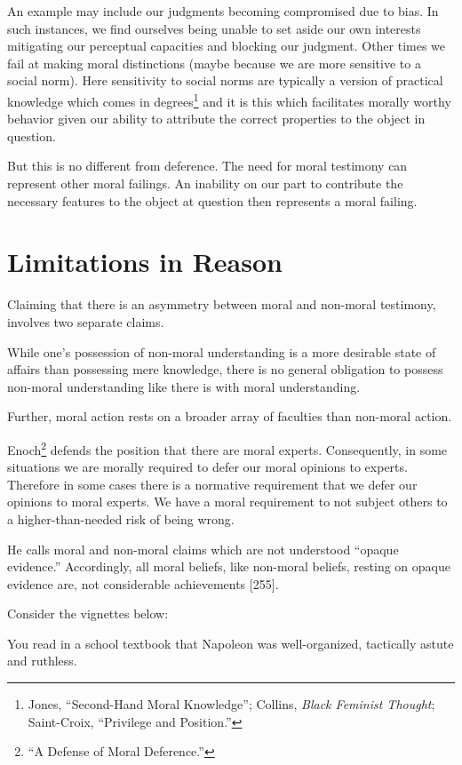 \documentclass[phdthesis,12pt,final]{wuthesis}
\theoremstyle{definition}
\theoremstyle{definition}
\theoremstyle{definition}
\theoremstyle{definition}
\theoremstyle{remark}
\begin{document}
An example may include our judgments becoming compromised due to bias. In such instances, we find ourselves being unable to set aside our own interests mitigating our perceptual capacities and blocking our judgment. Other times we fail at making moral distinctions (maybe because we are more sensitive to a social norm). Here sensitivity to social norms are typically a version of practical knowledge which comes in degrees\footnote{Jones, {``Second-{Hand Moral Knowledge}''}; Collins, \emph{Black Feminist Thought}; Saint-Croix, {``Privilege and {Position}.''}} and it is this which facilitates morally worthy behavior given our ability to attribute the correct properties to the object in question.

But this is no different from deference. The need for moral testimony can represent other moral failings. An inability on our part to contribute the necessary features to the object at question then represents a moral failing.

\section{Limitations in Reason}\label{limitations-in-reason}

Claiming that there is an asymmetry between moral and non-moral testimony, involves two separate claims.

While one's possession of non-moral understanding is a more desirable state of affairs than possessing mere knowledge, there is no general obligation to possess non-moral understanding like there is with moral understanding.

Further, moral action rests on a broader array of faculties than non-moral action.

Enoch\footnote{{``A {Defense} of {Moral Deference}.''}} defends the position that there are moral experts. Consequently, in some situations we are morally required to defer our moral opinions to experts. Therefore in some cases there is a normative requirement that we defer our opinions to moral experts. We have a moral requirement to not subject others to a higher-than-needed risk of being wrong.

He calls moral and non-moral claims which are not understood ``opaque evidence.'' Accordingly, all moral beliefs, like non-moral beliefs, resting on opaque evidence are, not considerable achievements {[}255{]}.

Consider the vignettes below:

You read in a school textbook that Napoleon was well-organized, tactically astute and ruthless.
\end{document}
